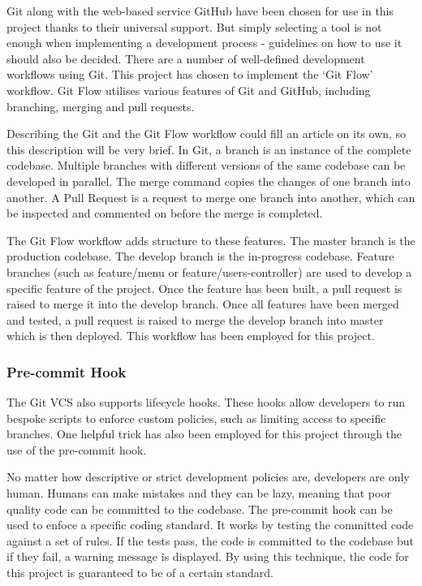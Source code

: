       Git along with the web-based service GitHub have been chosen for use in this project thanks to their universal support. But simply selecting a tool is not enough when implementing a development process - guidelines on how to use it should also be decided. There are a number of well-defined development workflows using Git. This project has chosen to implement the `Git Flow' workflow. Git Flow utilises various features of Git and GitHub, including branching, merging and pull requests. 

      Describing the Git and the Git Flow workflow could fill an article on its own, so this description will be very brief. In Git, a branch is an instance of the complete codebase. Multiple branches with different versions of the same codebase can be developed in parallel. The merge command copies the changes of one branch into another. A Pull Request is a request to merge one branch into another, which can be inspected and commented on before the merge is completed.

      The Git Flow workflow adds structure to these features. The master branch is the production codebase. The develop branch is the in-progress codebase. Feature branches (such as feature/menu or feature/users-controller) are used to develop a specific feature of the project. Once the feature has been built, a pull request is raised to merge it into the develop branch. Once all features have been merged and tested, a pull request is raised to merge the develop branch into master which is then deployed. This workflow has been employed for this project.

      \subsubsection{Pre-commit Hook}
        The Git VCS also supports lifecycle hooks. These hooks allow developers to run bespoke scripts to enforce custom policies, such as limiting access to specific branches. One helpful trick has also been employed for this project through the use of the pre-commit hook.

        No matter how descriptive or strict development policies are, developers are only human. Humans can make mistakes and they can be lazy, meaning that poor quality code can be committed to the codebase. The pre-commit hook can be used to enfoce a specific coding standard. It works by testing the committed code against a set of rules. If the tests pass, the code is committed to the codebase but if they fail, a warning message is displayed. By using this technique, the code for this project is guaranteed to be of a certain standard.


